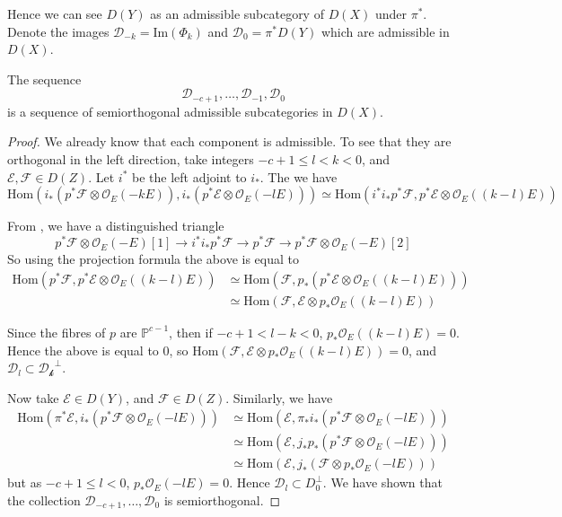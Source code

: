 Hence we can see $D(Y)$ as an admissible subcategory of $D(X)$ under $\pi^*$. Denote the images $\mathcal{D}_{-k}=\mathrm{Im}(\Phi_{k})$ and $\mathcal{D}_{0}= \pi^{*}D(Y)$ which are admissible in $D(X)$.

\begin{lemma}{}{}
    The sequence $$\mathcal{D}_{-c+1},\dots,\mathcal{D}_{-1},\mathcal{D}_0$$is a sequence of semiorthogonal admissible subcategories in $D(X)$.
\end{lemma}


\begin{proof}
We already know that each component is admissible. To see that they are orthogonal in the left direction, take integers $-c+1 \leq l <k <0$, and $\mathcal{E}, \mathcal{F}\in D(Z)$. Let $i^*$ be the left adjoint to $i_*$. The we have $$\mathrm{Hom}(i_{*}\left( p^{*}\mathcal{F}\otimes \mathcal{O}_{E}(-kE) \right), i_{*}\left( p^{*}\mathcal{E}\otimes \mathcal{O}_{E}(-lE) \right)  ) \simeq \mathrm{Hom}(i^{*}i_{*}p^{*}\mathcal{F}, p^{*}\mathcal{E}\otimes \mathcal{O}_{E}((k-l)E))$$

From \cite[Corollary~11.4]{Huybrechts}, we have a distinguished triangle $$p^{*}\mathcal{F}\otimes  \mathcal{O}_{E}(-E)[1]\to i^{*}i_{*}p^{*}\mathcal{F}\to p^{*}\mathcal{F}\to p^{*}\mathcal{F}\otimes \mathcal{O}_E(-E)[2]$$
So using the projection formula the above is equal to
\begin{align*}
\mathrm{Hom}(p^{*}\mathcal{F},p^{*}\mathcal{E} \otimes  \mathcal{O}_{E}((k-l)E)) &\simeq \mathrm{Hom}(\mathcal{F},p_{*}(p^{*}\mathcal{E} \otimes  \mathcal{O}_{E}((k-l)E)))  \\
&\simeq \mathrm{Hom}(\mathcal{F},\mathcal{E} \otimes p_{*} \mathcal{O}_{E}((k-l)E))
\end{align*}

Since the fibres of $p$ are $\mathbb{P}^{c-1}$, then if $-c+1<l-k<0$, $p_{*}\mathcal{O}_{E}((k-l)E)=0$. Hence the above is equal to 0, so $\mathrm{Hom}(\mathcal{F},\mathcal{E} \otimes p_{*} \mathcal{O}_{E}((k-l)E)) =0$, and $\mathcal{D}_{l}\subset \mathcal{D_k}^\perp$.

Now take $\mathcal{E}\in D(Y)$, and $\mathcal{F}\in D(Z)$. Similarly, we have
\begin{align*}
\mathrm{Hom}(\pi^{*}\mathcal{E},i_{*}(p^{*}\mathcal{F}\otimes \mathcal{O}_{E}(-lE))) &\simeq \mathrm{Hom}(\mathcal{E},\pi_{*}i_{*}(p^{*}\mathcal{F}\otimes \mathcal{O}_{E}(-lE))) \\
&\simeq \mathrm{Hom}(\mathcal{E},j_{*}p_{*}(p^{*}\mathcal{F}\otimes \mathcal{O}_{E}(-lE)))  \\
&\simeq \mathrm{Hom}(\mathcal{E},j_{*}(\mathcal{F}\otimes p_{*}\mathcal{O}_{E}(-lE)))
\end{align*}
but as $-c+1\leq l<0$, $p_{*}\mathcal{O}_{E}(-lE)=0$. Hence $\mathcal{D}_{l}\subset D_{0}^\perp$. We have shown that the collection $\mathcal{D}_{-c+1},\dots,\mathcal{D}_0$ is semiorthogonal.
\end{proof}

